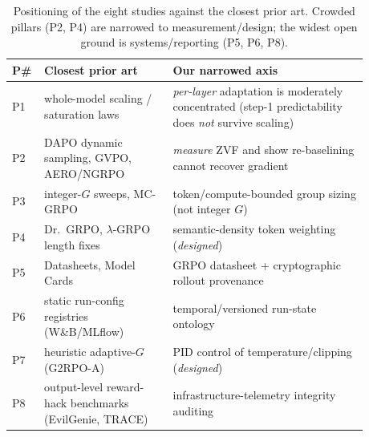 \begin{table}[t]
\centering
\small
\setlength{\tabcolsep}{4pt}
\begin{tabular}{@{}L{0.045\linewidth}L{0.33\linewidth}L{0.50\linewidth}@{}}
\toprule
\textbf{P\#} & \textbf{Closest prior art} & \textbf{Our narrowed axis} \\
\midrule
P1 & whole-model scaling / saturation laws & \emph{per-layer} adaptation is moderately concentrated (step-1 predictability does \emph{not} survive scaling) \\
P2 & DAPO dynamic sampling, GVPO, AERO/NGRPO & \emph{measure} ZVF and show re-baselining cannot recover gradient \\
P3 & integer-$G$ sweeps, MC-GRPO & token/compute-bounded group sizing (not integer $G$) \\
P4 & Dr.\ GRPO, $\lambda$-GRPO length fixes & semantic-density token weighting (\emph{designed}) \\
P5 & Datasheets, Model Cards & GRPO datasheet + cryptographic rollout provenance \\
P6 & static run-config registries (W\&B/MLflow) & temporal/versioned run-state ontology \\
P7 & heuristic adaptive-$G$ (G2RPO-A) & PID control of temperature/clipping (\emph{designed}) \\
P8 & output-level reward-hack benchmarks (EvilGenie, TRACE) & infrastructure-telemetry integrity auditing \\
\bottomrule
\end{tabular}
\caption{Positioning of the eight studies against the closest prior art. Crowded
pillars (P2, P4) are narrowed to measurement/design; the widest open ground is
systems/reporting (P5, P6, P8).}
\label{tab:position}
\end{table}

